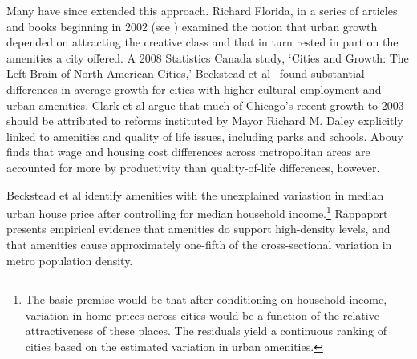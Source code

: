 Many have since extended this approach. Richard Florida, in a series of articles and books beginning in 2002 (see \cite{floridaCreativeClassEconomic2014, floridaEconomicGeographyTalent2002, floridaCompetingAgeTalent2005}) examined the notion that urban growth depended on attracting the creative class and that in turn rested in part on the amenities a city offered. A 2008  Statistics Canada study, `Cities and Growth: The Left Brain of North American Cities,' Beckstead et al \ found substantial differences in average growth for cities with higher cultural employment and urban amenities.  Clark et al \cite{clarkAmenitiesDriveUrban2002} argue that much of Chicago's recent growth to 2003  should be attributed to reforms instituted by Mayor Richard M.  Daley explicitly linked to amenities and quality of life issues, including parks and schools. Abouy \cite{albouyWhatAreCities2016} finds that wage and housing cost differences across metropolitan areas are accounted for more by productivity than quality-of-life differences, however. 

 Beckstead et al  \cite{becksteadCitiesGrowthLeft2008} identify amenities with the unexplained variastion in median urban house price after controlling for median household income.\footnote{  The basic premise would be that after conditioning on household income, variation in home prices across cities would be a function of the relative attractiveness of these places. The residuals yield a continuous ranking of cities based on the estimated variation in urban amenities.} Rappaport \cite{rappaportConsumptionAmenitiesCity2008} presents empirical evidence that amenities do support high-density levels, and that amenities cause approximately one-fifth of the cross-sectional variation in metro population density. 


  


\newpage
